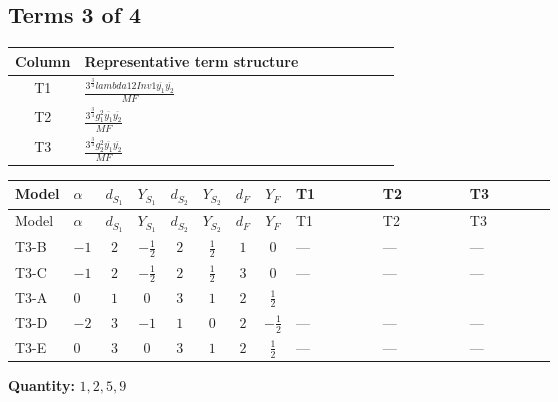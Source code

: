 \documentclass[8pt]{article}
\begin{document}
\begin{landscape}
\subsection*{Terms 3 of 4}
\begin{center}
\begin{tabular}{@{}c >{\raggedright\arraybackslash}p{0.82\linewidth}@{}}
\toprule
Column & Representative term structure \\
\midrule
T1 & \(\displaystyle \frac{3^{\frac{3}{4}} lambda12Inv1 \overline{y_{1}} \overline{y_{2}}}{MF}\) \\
\midrule
T2 & \(\displaystyle \frac{3^{\frac{3}{4}} g_{1}^{2} \overline{y_{1}} \overline{y_{2}}}{MF}\) \\
\midrule
T3 & \(\displaystyle \frac{3^{\frac{3}{4}} g_{2}^{2} \overline{y_{1}} \overline{y_{2}}}{MF}\) \\
\midrule
\bottomrule
\end{tabular}
\end{center}
\smallskip
\tiny
\begin{longtable}{@{}llcccccc >{\raggedright\arraybackslash}p{0.21\linewidth} >{\raggedright\arraybackslash}p{0.21\linewidth} >{\raggedright\arraybackslash}p{0.21\linewidth}@{}}
\toprule
Model & $\alpha$ & $d_{S_1}$ & $Y_{S_1}$ & $d_{S_2}$ & $Y_{S_2}$ & $d_F$ & $Y_F$ & T1 & T2 & T3 \\
\midrule
\endfirsthead
\toprule
Model & $\alpha$ & $d_{S_1}$ & $Y_{S_1}$ & $d_{S_2}$ & $Y_{S_2}$ & $d_F$ & $Y_F$ & T1 & T2 & T3 \\
\midrule
\endhead
T3-B & $-1$ & $2$ & $-\frac{1}{2}$ & $2$ & $\frac{1}{2}$ & $1$ & $0$ & --- & --- & --- \\
\midrule
T3-C & $-1$ & $2$ & $-\frac{1}{2}$ & $2$ & $\frac{1}{2}$ & $3$ & $0$ & --- & --- & --- \\
\midrule
T3-A & $0$ & $1$ & $0$ & $3$ & $1$ & $2$ & $\frac{1}{2}$ & \scriptsize\adjustbox{max width=\linewidth}{$\begin{gathered} \frac{3^{\frac{3}{4}} lambda12Inv1 \overline{y_{1}} \overline{y_{2}}}{6 MF}\end{gathered}$} & \scriptsize\adjustbox{max width=\linewidth}{$\begin{gathered} \frac{3^{\frac{3}{4}} g_{1}^{2} \overline{y_{1}} \overline{y_{2}}}{8 MF}\end{gathered}$} & \scriptsize\adjustbox{max width=\linewidth}{$\begin{gathered} \frac{25 \cdot 3^{\frac{3}{4}} g_{2}^{2} \overline{y_{1}} \overline{y_{2}}}{24 MF}\end{gathered}$} \\
\midrule
T3-D & $-2$ & $3$ & $-1$ & $1$ & $0$ & $2$ & $-\frac{1}{2}$ & --- & --- & --- \\
\midrule
T3-E & $0$ & $3$ & $0$ & $3$ & $1$ & $2$ & $\frac{1}{2}$ & --- & --- & --- \\
\midrule
\bottomrule
\end{longtable}
\clearpage
\noindent\textbf{Quantity: }$\mathrm{1,2,5,9}$\par\smallskip

\end{landscape}
\end{document}
